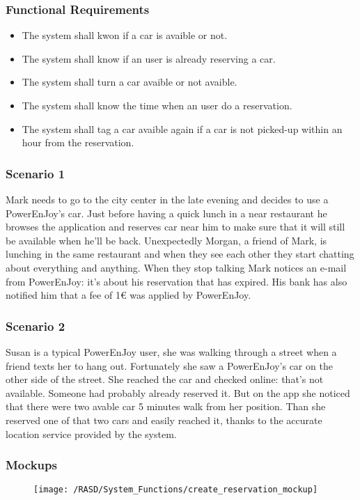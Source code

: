 \subsubsection{Functional Requirements}
\begin{itemize}
  \item The system shall kwon if a car is avaible or not.
  \item The system shall know if an user is already reserving a car.
  \item The system shall turn a car avaible or not avaible.
  \item The system shall know the time when an user do a reservation.
  \item The system shall tag a car avaible again if a car is not picked-up within an hour from the reservation.
\end{itemize}

\subsubsection{Scenario 1}
Mark needs to go to the city center in the late evening and decides to use a PowerEnJoy's car. Just before having a quick lunch in a near restaurant he browses the application and reserves car near him to make sure that it will still be available when he'll be back.
Unexpectedly Morgan, a friend of Mark, is lunching in the same restaurant and when they see each other they start chatting about everything and anything. When they stop talking Mark notices an e-mail from PowerEnJoy: it's about his reservation that has expired. His bank has also notified him that a fee of 1€ was applied by PowerEnJoy.


\subsubsection{Scenario 2}
Susan is a typical PowerEnJoy user, she was walking through a street when a friend texts her to hang out. Fortunately she saw a PowerEnJoy's car on the other side of the street. She reached the car and checked online: that's not available. Someone had probably already reserved it. But on the app she noticed that there were two avable car 5 minutes walk from her position. Than she reserved one of that two cars and easily reached it, thanks to the accurate location service provided by the system. 


\subsubsection{Mockups}
\begin{figure}[!ht]
  \centering
  \vspace{0.1cm}
  \texttt{[image: /RASD/System\_Functions/create\_reservation\_mockup]}\\
  \vspace{0.4cm}
  \label{fig:create_reservation_mockup} 
\end{figure}


